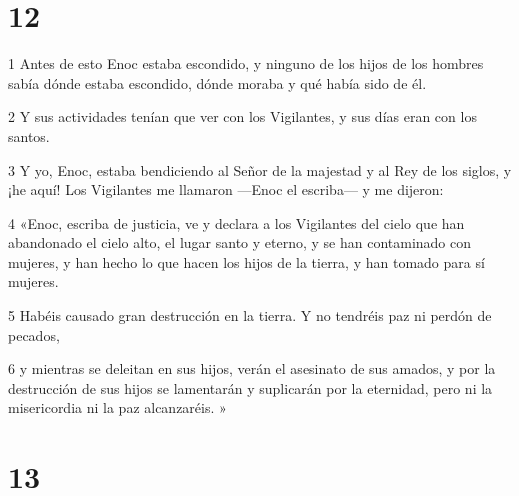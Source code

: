 \chapter{12}

\par 1 Antes de esto Enoc estaba escondido, y ninguno de los hijos de los hombres sabía dónde estaba escondido, dónde moraba y qué había sido de él.
\par 2 Y sus actividades tenían que ver con los Vigilantes, y sus días eran con los santos.
\par 3 Y yo, Enoc, estaba bendiciendo al Señor de la majestad y al Rey de los siglos, y ¡he aquí! Los Vigilantes me llamaron —Enoc el escriba— y me dijeron:
\par 4 «Enoc, escriba de justicia, ve y declara a los Vigilantes del cielo que han abandonado el cielo alto, el lugar santo y eterno, y se han contaminado con mujeres, y han hecho lo que hacen los hijos de la tierra, y han tomado para sí mujeres.
\par 5 Habéis causado gran destrucción en la tierra. Y no tendréis paz ni perdón de pecados,
\par 6 y mientras se deleitan en sus hijos, verán el asesinato de sus amados, y por la destrucción de sus hijos se lamentarán y suplicarán por la eternidad, pero ni la misericordia ni la paz alcanzaréis. »

\chapter{13}

